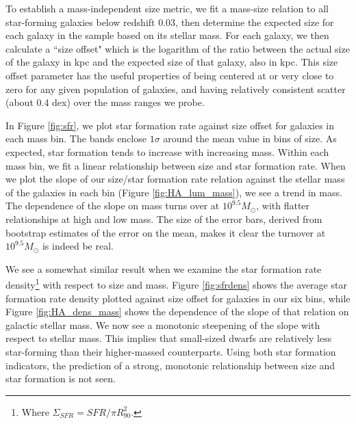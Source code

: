 \documentclass[iop]{emulateapj}
\begin{document}
To establish a mass-independent size metric, we fit a mass-size relation to all star-forming galaxies below redshift 0.03, then determine the expected size for each galaxy in the sample based on its stellar mass. For each galaxy, we then calculate a ``size offset" which is the logarithm of the ratio between the actual size of the galaxy in kpc and the expected size of that galaxy, also in kpc. This size offset parameter has the useful properties of being centered at or very close to zero for any given population of galaxies, and having relatively consistent scatter (about 0.4 dex) over the mass ranges we probe.


In Figure \ref{fig:sfr}, we plot star formation rate against size offset for galaxies in each mass bin. The bands enclose $1\sigma$ around the mean value in bins of size. As expected, star formation tends to increase with increasing mass. Within each mass bin, we fit a linear relationship between size and star formation rate. When we plot the slope of our size/star formation rate relation against the stellar mass of the galaxies in each bin (Figure \ref{fig:HA_lum_mass}), we see a trend in mass. The dependence of the slope on mass turns over at $10^{9.5} M_{\odot}$, with flatter relationships at high and low mass. The size of the error bars, derived from bootstrap estimates of the error on the mean, makes it clear the turnover at $10^{9.5} M_{\odot}$ is indeed be real.

We see a somewhat similar result when we examine the star formation rate density\footnote{Where $\Sigma_{SFR} = SFR/\pi R_{90}^2$.} with respect to size and mass. Figure \ref{fig:sfrdens} shows the average star formation rate density plotted against size offset for galaxies in our six bins, while Figure \ref{fig:HA_dens_mass} shows the dependence of the slope of that relation on galactic stellar mass. We now see a monotonic steepening of the slope with respect to stellar mass. This implies that small-sized dwarfs are relatively less star-forming than their higher-massed counterparts. Using both star formation indicators, the prediction of a strong, monotonic relationship between size and star formation is not seen.
\end{document}
